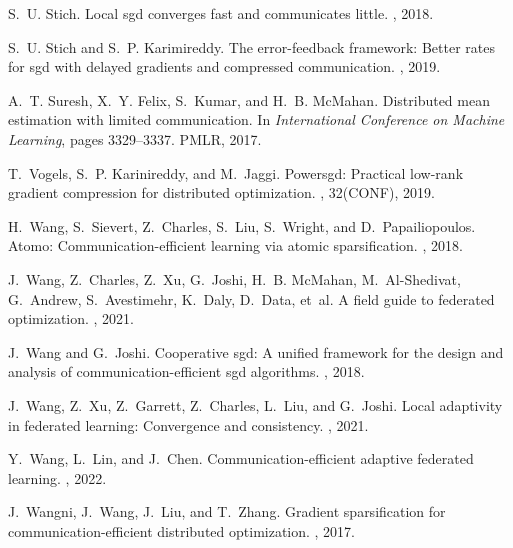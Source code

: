 \documentclass[11pt]{article}
\begin{document}
\begin{thebibliography}{10}
S.~U. Stich.
\newblock Local sgd converges fast and communicates little.
, 2018.

S.~U. Stich and S.~P. Karimireddy.
\newblock The error-feedback framework: Better rates for sgd with delayed
  gradients and compressed communication.
, 2019.

A.~T. Suresh, X.~Y. Felix, S.~Kumar, and H.~B. McMahan.
\newblock Distributed mean estimation with limited communication.
\newblock In {\em International Conference on Machine Learning}, pages
  3329--3337. PMLR, 2017.

T.~Vogels, S.~P. Karinireddy, and M.~Jaggi.
\newblock Powersgd: Practical low-rank gradient compression for distributed
  optimization.
, 32(CONF), 2019.

H.~Wang, S.~Sievert, Z.~Charles, S.~Liu, S.~Wright, and D.~Papailiopoulos.
\newblock Atomo: Communication-efficient learning via atomic sparsification.
, 2018.

J.~Wang, Z.~Charles, Z.~Xu, G.~Joshi, H.~B. McMahan, M.~Al-Shedivat, G.~Andrew,
  S.~Avestimehr, K.~Daly, D.~Data, et~al.
\newblock A field guide to federated optimization.
, 2021.

J.~Wang and G.~Joshi.
\newblock Cooperative sgd: A unified framework for the design and analysis of
  communication-efficient sgd algorithms.
, 2018.

J.~Wang, Z.~Xu, Z.~Garrett, Z.~Charles, L.~Liu, and G.~Joshi.
\newblock Local adaptivity in federated learning: Convergence and consistency.
, 2021.

Y.~Wang, L.~Lin, and J.~Chen.
\newblock Communication-efficient adaptive federated learning.
, 2022.

J.~Wangni, J.~Wang, J.~Liu, and T.~Zhang.
\newblock Gradient sparsification for communication-efficient distributed
  optimization.
, 2017.


\end{thebibliography}
\end{document}
